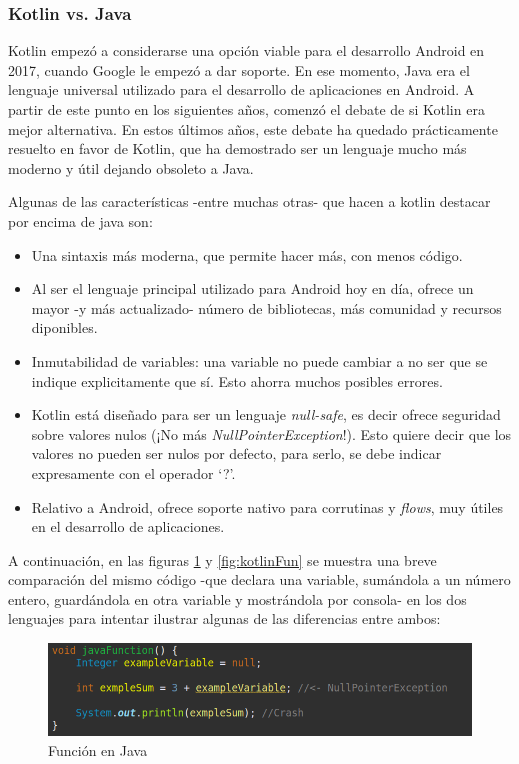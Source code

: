 \subsubsection{Kotlin vs. Java}
\label{subsec:kotlinvsjava}
Kotlin empezó a considerarse una opción viable para el desarrollo Android en 2017, cuando Google le empezó a dar soporte. En ese momento, Java era el lenguaje universal utilizado para el desarrollo de aplicaciones en Android. A partir de este punto en los siguientes años, comenzó el debate de si Kotlin era mejor alternativa. En estos últimos años, este debate ha quedado prácticamente resuelto en favor de Kotlin, que ha demostrado ser un lenguaje mucho más moderno y útil dejando obsoleto a Java.

Algunas de las características -entre muchas otras- que hacen a kotlin destacar por encima de java son:
\begin{itemize}
    \item Una sintaxis más moderna, que permite hacer más, con menos código.
    \item Al ser el lenguaje principal utilizado para Android hoy en día, ofrece un mayor -y más actualizado- número de bibliotecas, más comunidad y recursos diponibles.
    \item Inmutabilidad de variables: una variable no puede cambiar a no ser que se indique explicitamente que sí. Esto ahorra muchos posibles errores.
    \item Kotlin está diseñado para ser un lenguaje \textit{null-safe}, es decir ofrece seguridad sobre valores nulos (¡No más \textit{NullPointerException}!). Esto quiere decir que los valores no pueden ser nulos por defecto, para serlo, se debe indicar expresamente con el operador ‘?’.
    \item Relativo a Android, ofrece soporte nativo para corrutinas y \textit{flows}, muy útiles en el desarrollo de aplicaciones.
\end{itemize}
A continuación, en las figuras \ref{fig:javaFun} y \ref{fig:kotlinFun} se muestra una breve comparación del mismo código -que declara una variable, sumándola a un número entero, guardándola en otra variable y mostrándola por consola- en los dos lenguajes para intentar ilustrar algunas de las diferencias entre ambos:
\begin{figure}[h]
	\centering
	\includegraphics[width = 1\textwidth]{Imagenes/Fuentes/javaFun.png}
	\caption{Función en Java}
	\label{fig:javaFun}
\end{figure}
